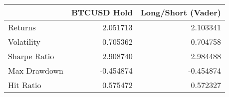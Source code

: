 \begin{tabular}{lrr}
\toprule
{} &  BTCUSD Hold &  Long/Short (Vader) \\
\midrule
Returns      &     2.051713 &            2.103341 \\
Volatility   &     0.705362 &            0.704758 \\
Sharpe Ratio &     2.908740 &            2.984488 \\
Max Drawdown &    -0.454874 &           -0.454874 \\
Hit Ratio    &     0.575472 &            0.572327 \\
\bottomrule
\end{tabular}
